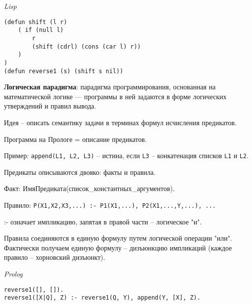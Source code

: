 \textit{Lisp}
    
\begin{lstlisting}[basicstyle=\ttfamily\small, frame=single] 
(defun shift (l r)
    ( if (null l)
        r
        (shift (cdrl) (cons (car l) r))
    )
)
(defun reverse1 (s) (shift s nil)) 
    \end{lstlisting}
    
\bigbreak
\textbf{Логическая парадигма}:  парадигма программирования, основанная на математической логике — программы в ней задаются в форме логических утверждений и правил вывода.

Идея -- описать семантику задачи в терминах формул исчисления предикатов. 

Программа на Прологе = описание предикатов.

Пример: \texttt{append(L1, L2, L3)} -- истина, если \texttt{L3} -- конкатенация списков \texttt{L1} и \texttt{L2}.

Предикаты описываются двояко: факты и правила. 

Факт: ИмяПредиката(список\_константных\_аргументов). 

Правило: \texttt{P(X1,X2,X3,...) :- P1(X1,...), P2(X1,...,Y,...), ...}

:- означает импликацию, запятая в правой части -- логическое "и".

Правила соединяются в единую формулу путем логической операции "или". Фактически получаем единую формулу -- дизъюнкцию импликаций (каждое правило -- хорновский дизъюнкт).

\textit{Prolog}
    
\begin{lstlisting}[basicstyle=\ttfamily\small, frame=single] 
reverse1([], []).
reverse1([X|Q], Z) :- reverse1(Q, Y), append(Y, [X], Z).
    \end{lstlisting}


